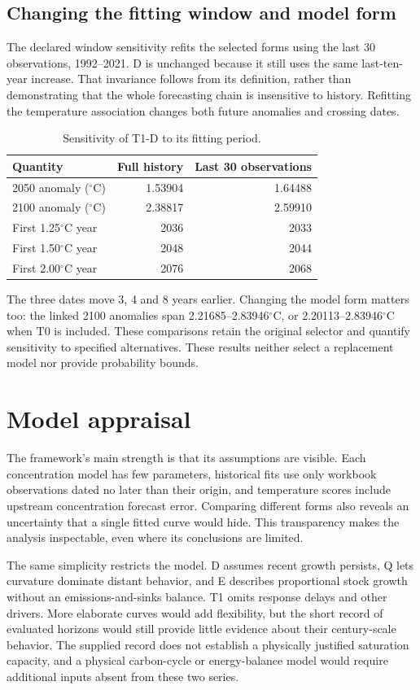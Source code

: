\documentclass[11pt,a4paper]{article}
\newcommand{\p}[2]{#2\par}
\newcommand{\txt}[2]{#2}
\newcommand{\degC}{\ensuremath{{}^{\circ}\mathrm{C}}}
\begin{document}
\subsection{Changing the fitting window and model form}
\p{SEN01}{The declared window sensitivity refits the selected forms using the last 30 observations, 1992--2021. D is unchanged because it still uses the same last-ten-year increase. That invariance follows from its definition, rather than demonstrating that the whole forecasting chain is insensitive to history. Refitting the temperature association changes both future anomalies and crossing dates.}
\begin{table}[H]\centering\small
\caption{\txt{TC11}{Sensitivity of T1-D to its fitting period.}}\label{tab:window}
\begin{tabular}{lrr}\toprule
Quantity & Full history & Last 30 observations\\\midrule
2050 anomaly (\degC) & 1.53904 & 1.64488\\
2100 anomaly (\degC) & 2.38817 & 2.59910\\
First 1.25\degC{} year & 2036 & 2033\\
First 1.50\degC{} year & 2048 & 2044\\
First 2.00\degC{} year & 2076 & 2068\\\bottomrule
\end{tabular}
\end{table}
\p{SEN02}{The three dates move 3, 4 and 8 years earlier. Changing the model form matters too: the linked 2100 anomalies span 2.21685--2.83946\degC{}, or 2.20113--2.83946\degC{} when T0 is included. These comparisons retain the original selector and quantify sensitivity to specified alternatives. These results neither select a replacement model nor provide probability bounds.}
\section{Model appraisal}\label{sec:appraisal}
\p{APP01}{The framework's main strength is that its assumptions are visible. Each concentration model has few parameters, historical fits use only workbook observations dated no later than their origin, and temperature scores include upstream concentration forecast error. Comparing different forms also reveals an uncertainty that a single fitted curve would hide. This transparency makes the analysis inspectable, even where its conclusions are limited.}
\p{APP02}{The same simplicity restricts the model. D assumes recent growth persists, Q lets curvature dominate distant behavior, and E describes proportional stock growth without an emissions-and-sinks balance. T1 omits response delays and other drivers. More elaborate curves would add flexibility, but the short record of evaluated horizons would still provide little evidence about their century-scale behavior. The supplied record does not establish a physically justified saturation capacity, and a physical carbon-cycle or energy-balance model would require additional inputs absent from these two series.}
\end{document}
